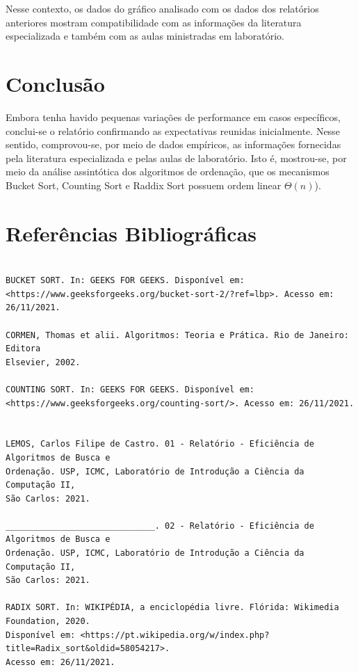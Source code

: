 \documentclass[a4paper, 12pt]{article}
\begin{document}
Nesse contexto, os dados do gráfico analisado com os dados dos relatórios anteriores mostram compatibilidade com as informações da literatura especializada e também com as aulas ministradas em laboratório.

\section{Conclusão}

\tab{ }Embora tenha havido pequenas variações de performance em casos específicos, conclui-se o relatório confirmando as expectativas reunidas inicialmente. Nesse sentido, comprovou-se, por meio de dados empíricos, as informações fornecidas pela literatura especializada e pelas aulas de laboratório. Isto é, mostrou-se, por meio da análise assintótica dos algoritmos de ordenação, que os mecanismos Bucket Sort, Counting Sort e Raddix Sort possuem ordem linear $\Theta(n)$).


\vspace{0.8cm}
\section{Referências Bibliográficas}
\begin{verbatim}

BUCKET SORT. In: GEEKS FOR GEEKS. Disponível em: 
<https://www.geeksforgeeks.org/bucket-sort-2/?ref=lbp>. Acesso em: 26/11/2021.

CORMEN, Thomas et alii. Algoritmos: Teoria e Prática. Rio de Janeiro: Editora 
Elsevier, 2002.

COUNTING SORT. In: GEEKS FOR GEEKS. Disponível em: 
<https://www.geeksforgeeks.org/counting-sort/>. Acesso em: 26/11/2021.


LEMOS, Carlos Filipe de Castro. 01 - Relatório - Eficiência de Algoritmos de Busca e
Ordenação. USP, ICMC, Laboratório de Introdução a Ciência da Computação II, 
São Carlos: 2021.

______________________________. 02 - Relatório - Eficiência de Algoritmos de Busca e
Ordenação. USP, ICMC, Laboratório de Introdução a Ciência da Computação II, 
São Carlos: 2021.

RADIX SORT. In: WIKIPÉDIA, a enciclopédia livre. Flórida: Wikimedia Foundation, 2020. 
Disponível em: <https://pt.wikipedia.org/w/index.php?title=Radix_sort&oldid=58054217>. 
Acesso em: 26/11/2021.
\end{verbatim}
\end{document}
